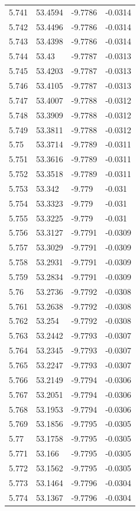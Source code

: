 \begin{tabular}{llll}
5.741 & 53.4594 & -9.7786 & -0.0314 \\
5.742 & 53.4496 & -9.7786 & -0.0314 \\
5.743 & 53.4398 & -9.7786 & -0.0314 \\
5.744 & 53.43 & -9.7787 & -0.0313 \\
5.745 & 53.4203 & -9.7787 & -0.0313 \\
5.746 & 53.4105 & -9.7787 & -0.0313 \\
5.747 & 53.4007 & -9.7788 & -0.0312 \\
5.748 & 53.3909 & -9.7788 & -0.0312 \\
5.749 & 53.3811 & -9.7788 & -0.0312 \\
5.75 & 53.3714 & -9.7789 & -0.0311 \\
5.751 & 53.3616 & -9.7789 & -0.0311 \\
5.752 & 53.3518 & -9.7789 & -0.0311 \\
5.753 & 53.342 & -9.779 & -0.031 \\
5.754 & 53.3323 & -9.779 & -0.031 \\
5.755 & 53.3225 & -9.779 & -0.031 \\
5.756 & 53.3127 & -9.7791 & -0.0309 \\
5.757 & 53.3029 & -9.7791 & -0.0309 \\
5.758 & 53.2931 & -9.7791 & -0.0309 \\
5.759 & 53.2834 & -9.7791 & -0.0309 \\
5.76 & 53.2736 & -9.7792 & -0.0308 \\
5.761 & 53.2638 & -9.7792 & -0.0308 \\
5.762 & 53.254 & -9.7792 & -0.0308 \\
5.763 & 53.2442 & -9.7793 & -0.0307 \\
5.764 & 53.2345 & -9.7793 & -0.0307 \\
5.765 & 53.2247 & -9.7793 & -0.0307 \\
5.766 & 53.2149 & -9.7794 & -0.0306 \\
5.767 & 53.2051 & -9.7794 & -0.0306 \\
5.768 & 53.1953 & -9.7794 & -0.0306 \\
5.769 & 53.1856 & -9.7795 & -0.0305 \\
5.77 & 53.1758 & -9.7795 & -0.0305 \\
5.771 & 53.166 & -9.7795 & -0.0305 \\
5.772 & 53.1562 & -9.7795 & -0.0305 \\
5.773 & 53.1464 & -9.7796 & -0.0304 \\
5.774 & 53.1367 & -9.7796 & -0.0304 \\

\end{tabular}
